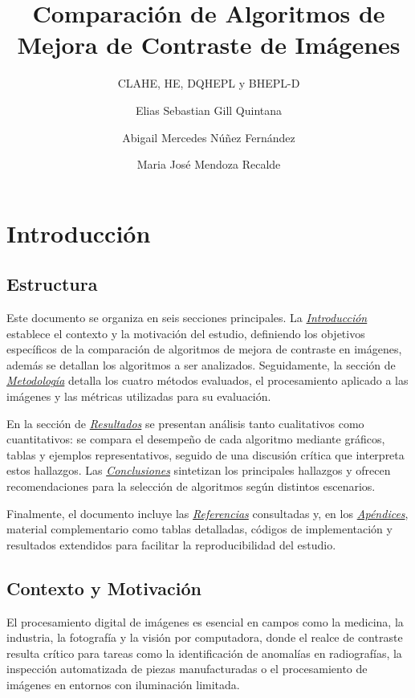 \documentclass[sigchi]{acmart}
\title{Comparación de Algoritmos de Mejora de Contraste de Imágenes}
\subtitle{CLAHE, HE, DQHEPL y BHEPL-D}
\author{Elias Sebastian Gill Quintana}
\affiliation{
    \institution{Facultad Politecnica - UNA}
    \city{San Lorenzo}
    \country{Paraguay}
}
\author{Abigail Mercedes Núñez Fernández}
\affiliation{
    \institution{Facultad Politecnica - UNA}
    \city{San Lorenzo}
    \country{Paraguay}
}
\author{Maria José Mendoza Recalde}
\affiliation{
    \institution{Facultad Politecnica - UNA}
    \city{San Lorenzo}
    \country{Paraguay}
}
\begin{document}
\maketitle

\section{Introducción}

\subsection{Estructura}
\label{subsec:estructura}

Este documento se organiza en seis secciones principales. La
\emph{\hyperref[sec:contexto]{Introducción}} establece el contexto y la motivación del
estudio, definiendo los objetivos específicos de la comparación de algoritmos de mejora de
contraste en imágenes, además se detallan los algoritmos a ser analizados. Seguidamente, la sección de
\emph{\hyperref[sec:metodologia]{Metodología}} detalla los cuatro métodos evaluados, el
procesamiento aplicado a las imágenes y las métricas utilizadas para su evaluación.

En la sección de \emph{\hyperref[sec:resultados]{Resultados}} se presentan análisis tanto
cualitativos como cuantitativos: se compara el desempeño de cada algoritmo mediante gráficos,
tablas y ejemplos representativos, seguido de una discusión crítica que interpreta estos
hallazgos. Las \emph{\hyperref[sec:conclusiones]{Conclusiones}} sintetizan los principales
hallazgos y ofrecen recomendaciones para la selección de algoritmos según distintos escenarios.

Finalmente, el documento incluye las \emph{\hyperref[sec:bibliography]{Referencias}} consultadas
y, en los \emph{\hyperref[sec:apendices]{Apéndices}}, material complementario como tablas
detalladas, códigos de implementación y resultados extendidos para facilitar la
reproducibilidad del estudio.

\subsection{Contexto y Motivación}
\label{subsec:contexto}

El procesamiento digital de imágenes es esencial en campos como la medicina, la industria, la
fotografía y la visión por computadora, donde el realce de contraste resulta crítico para
tareas como la identificación de anomalías en radiografías, la inspección automatizada de
piezas manufacturadas o el procesamiento de imágenes en entornos con iluminación limitada.
\end{document}
